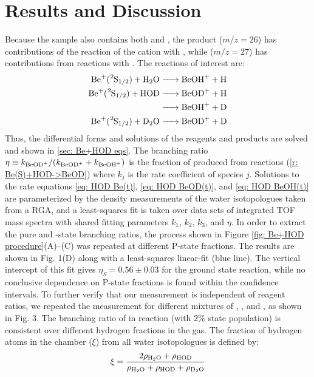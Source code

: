 \section{Results and Discussion}

Because the  sample also contains both  and , the product  ($m/z = 26$) has contributions of the reaction of the cation with , while  ($m/z = 27$) has contributions from reactions with . The reactions of interest are:
\begin{align}
	\ce{Be+(^2S1/2) + H2O & -> BeOH+ + H} \nonumber \\
	\ce{Be+(^2S1/2) + HOD & -> BeOD+ + H} \label{r: Be(S)+HOD->BeOD} \\
	\ce{& -> BeOH+ + D} \label{r: Be(S)+HOD->BeOH} \\
	\ce{Be+(^2S1/2) + D2O & -> BeOD+ + D} \label{r: Be(S)+D2O->BeOD}
\end{align}
Thus, the differential forms and solutions of the reagents and products are solved and shown in \ref{sec: Be+HOD eqs}. The branching ratio $\eta \equiv k_{\ce{BeOD+}}/(k_{\ce{BeOD+}} + k_{\ce{BeOH+}})$ is the fraction of  produced from reactions (\ref{r: Be(S)+HOD->BeOD}) where $k_j$ is the rate coefficient of species $j$. Solutions to the rate equations \ref{eq: HOD Be(t)}, \ref{eq: HOD BeOD(t)}, and \ref{eq: HOD BeOH(t)} are parameterized by the density measurements of the water isotopologues taken from a RGA, and a least-squares fit is taken over data sets of integrated TOF mass spectra with shared fitting parameters $k_1$, $k_2$, $k_3$, and $\eta$. In order to extract the pure  and -state branching ratios, the process shown in Figure \ref{fig: Be+HOD procedure}(A)–(C) was repeated at different P-state fractions. The results are shown in Fig. 1(D) along with a least-squares linear-fit (blue line). The vertical intercept of this fit gives $\eta_S = 0.56 \pm 0.03$ for the ground  state reaction, while no conclusive dependence on P-state fractions is found within the confidence intervals. To further verify that our measurement is independent of reagent ratios, we repeated the measurement for different mixtures of , , and , as shown in Fig. 3. The branching ratio of  in reaction  (with 2\%  state population) is consistent over different hydrogen fractions in the gas. The fraction of hydrogen atoms in the chamber ($\xi$) from all water isotopologues is defined by:
\begin{equation}
	\xi = \frac{2 \rho_{\ce{H2O}} + \rho_{\ce{HOD}}}{\rho_{\ce{H2O}} + \rho_{\ce{HOD}} + \rho_{\ce{D2O}}}
\end{equation}
